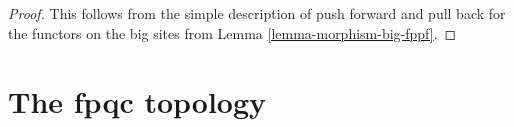 \begin{proof}
This follows from the simple description of push forward
and pull back for the functors on the big sites from
Lemma \ref{lemma-morphism-big-fppf}.
\end{proof}




































































































\section{The fpqc topology}
\label{section-fpqc}

